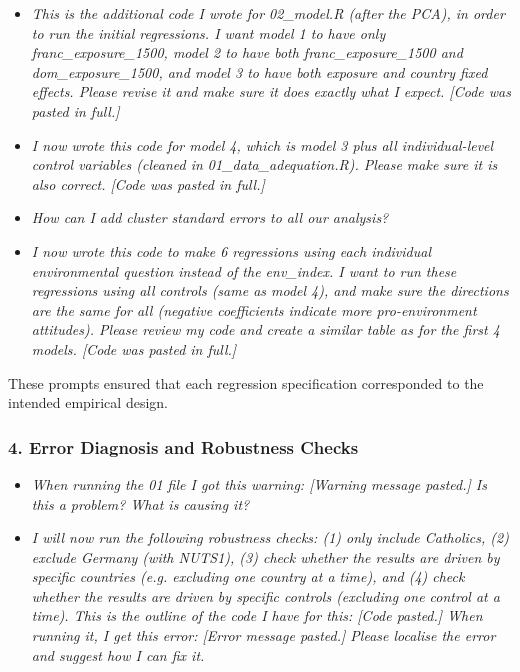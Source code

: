 \documentclass[12pt, a4paper]{article}
\begin{document}
\begin{itemize}
\item \textit{This is the additional code I wrote for 02\_model.R (after the PCA), in order to run the initial regressions. I want model 1 to have only franc\_exposure\_1500, model 2 to have both franc\_exposure\_1500 and dom\_exposure\_1500, and model 3 to have both exposure and country fixed effects. Please revise it and make sure it does exactly what I expect. [Code was pasted in full.]}

\item \textit{I now wrote this code for model 4, which is model 3 plus all individual-level control variables (cleaned in 01\_data\_adequation.R). Please make sure it is also correct. [Code was pasted in full.]}

\item \textit{How can I add cluster standard errors to all our analysis?}

\item \textit{I now wrote this code to make 6 regressions using each individual environmental question instead of the env\_index. I want to run these regressions using all controls (same as model 4), and make sure the directions are the same for all (negative coefficients indicate more pro-environment attitudes). Please review my code and create a similar table as for the first 4 models. [Code was pasted in full.]}
\end{itemize}

These prompts ensured that each regression specification corresponded to the intended empirical design.


\subsubsection*{4. Error Diagnosis and Robustness Checks}

\begin{itemize}
\item \textit{When running the 01 file I got this warning: [Warning message pasted.] Is this a problem? What is causing it?}

\item \textit{I will now run the following robustness checks: (1) only include Catholics, (2) exclude Germany (with NUTS1), (3) check whether the results are driven by specific countries (e.g. excluding one country at a time), and (4) check whether the results are driven by specific controls (excluding one control at a time). This is the outline of the code I have for this: [Code pasted.] When running it, I get this error: [Error message pasted.] Please localise the error and suggest how I can fix it.}
\end{itemize}
\end{document}
